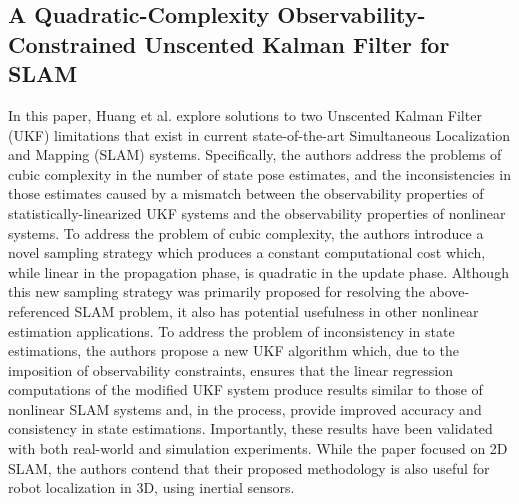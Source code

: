 \subsection{A Quadratic-Complexity Observability-Constrained Unscented Kalman Filter for SLAM}

In this paper, Huang et al. explore solutions to two Unscented Kalman Filter (UKF) limitations that exist in current state-of-the-art Simultaneous Localization and Mapping (SLAM) systems. Specifically, the authors address the problems of cubic complexity in the number of state pose estimates, and the inconsistencies in those estimates caused by a mismatch between the observability properties of statistically-linearized UKF systems and the observability properties of nonlinear systems. To address the problem of cubic complexity, the authors introduce a novel sampling strategy which produces a constant computational cost which, while linear in the propagation phase, is quadratic in the update phase. Although this new sampling strategy was primarily proposed for resolving the above-referenced SLAM problem, it also has potential usefulness in other nonlinear estimation applications. To address the problem of inconsistency in state estimations, the authors propose a new UKF algorithm which, due to the imposition of observability constraints, ensures that the linear regression computations of the modified UKF system produce results similar to those of nonlinear SLAM systems and, in the process, provide improved accuracy and consistency in state estimations. Importantly, these results have been validated with both real-world and simulation experiments. While the paper focused on 2D SLAM, the authors contend that their proposed methodology is also useful for robot localization in 3D, using inertial sensors.

